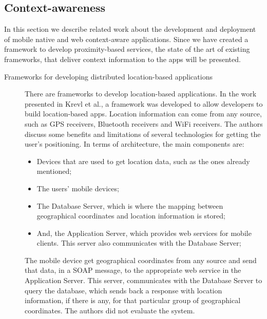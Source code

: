 \subsection{Context-awareness}
\label{sub:frameworks_context_aware}
In this section we describe related work about the
development and deployment of mobile native and web
context-aware applications.
Since we have created a framework to develop
proximity-based services, the state
of the art of existing frameworks, that deliver
context information to the apps will be presented.
\begin{description}
  \item[Frameworks for developing distributed
  location-based applications]
  There are frameworks to develop location-based
  applications.
  In the work presented in Krevl et al.\cite{Krevl2006},
  a framework
  was developed to allow developers to build
  location-based apps. Location information can come
  from any source, such as \gls{GPS} receivers, Bluetooth
  receivers and \gls{WiFi} receivers.
  The authors discuss some benefits and limitations
  of several technologies for getting the
  user's positioning.
  In terms of architecture, the main components
  are:
  \begin{itemize}
  \item
  Devices that are used to get location data, such as
  the ones already mentioned;
  \item The users' mobile devices;
  \item The Database Server, which is where the mapping
  between geographical coordinates and location
  information is stored;
  \item And, the Application Server, which provides web services for
  mobile clients. This server also communicates
  with the Database Server;
  \end{itemize}
  The mobile device get geographical coordinates
  from any source and send that data, in a
  \gls{SOAP}\cite{Seely:2001:SCP:560836} message,
  to the appropriate web service in the Application
  Server. This server, communicates with the Database Server
  to query the database, which sends back a response with
  location information, if there is any, for that
  particular group of geographical coordinates.
  The authors did not evaluate the system.


\end{description}
